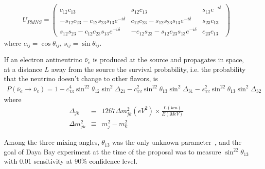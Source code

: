 \allowdisplaybreaks
\begin{align}
U_{PMNS}=
\begin{pmatrix}
c_{12}c_{13} & s_{12}c_{13} & s_{13}e^{-i\delta} \\
-s_{12}c_{23}-c_{12}s_{23}s_{13}e^{-i\delta} & c_{12}c_{23}-s_{12}s_{23}s_{13}e^{-i\delta} & s_{23}c_{13} \\
s_{12}s_{23}-c_{12}c_{23}s_{13}e^{-i\delta} & -c_{12}s_{23}-s_{12}c_{23}s_{13}e^{-i\delta} & c_{23}c_{13}
\end{pmatrix}
\end{align}
where $c_{ij}=\cos\theta_{ij}$, $s_{ij}=\sin\theta_{ij}$.

If an electron antineutrino $\bar{\nu}_e$ is produced at the source and propagates in space, at a distance $L$ away from the source the survival probability, i.e. the probability that the neutrino doesn't change to other flavors, is
\allowdisplaybreaks
\begin{align}
P(\bar{\nu}_e\rightarrow\bar{\nu}_e)=1-c^4_{13}\sin^22\theta_{12}\sin^2\Delta_{21}-c^2_{12}\sin^22\theta_{13}\sin^2\Delta_{31}-s^2_{12}\sin^22\theta_{13}\sin^2\Delta_{32}
\end{align}
where
\begin{eqnarray}
	\Delta_{jk} & \equiv & 1267\Delta m^2_{jk}(eV^2)\times \frac{L(km)}{E(MeV)} \\
	\Delta m^2_{jk} & \equiv & m^2_j-m^2_k
\end{eqnarray}

Among the three mixing angles, $\theta_{13}$ was the only unknown parameter~\cite{dybtdr}, and the goal of Daya Bay experiment at the time of the proposal was to measure $\sin^22\theta_{13}$ with $0.01$ sensitivity at $90\%$ confidence level.


